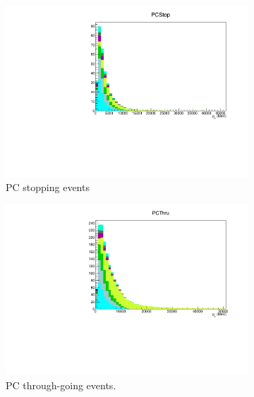 \begin{figure}[ht]
    \begin{subfigure}[t]{0.49\textwidth}
    \includegraphics[width=\textwidth, trim= 0 0 0 30, clip]{Figures/Selections/AtmosphericByMode/PCStop_LepMom.pdf}
    \caption{PC stopping events}
    \end{subfigure}
    \begin{subfigure}[t]{0.49\textwidth}
    \includegraphics[width=\textwidth, trim= 0 0 0 30, clip]{Figures/Selections/AtmosphericByMode/PCThru_LepMom.pdf}
    \caption{PC through-going events.}
    \end{subfigure}
    \begin{subfigure}[t]{0.49\textwidth}

\end{subfigure}
\end{figure}
